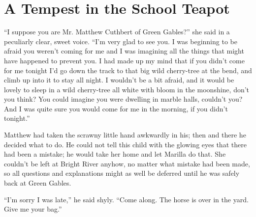 \documentclass{article}
\begin{document}
\section{A Tempest in the School Teapot}
``I suppose you are Mr. Matthew Cuthbert of Green Gables?'' she said in a peculiarly clear, sweet voice. ``I'm very glad to see you. I was beginning to be afraid you weren't coming for me and I was imagining all the things that might have happened to prevent you. I had made up my mind that if you didn't come for me tonight I'd go down the track to that big wild cherry-tree at the bend, and climb up into it to stay all night. I wouldn't be a bit afraid, and it would be lovely to sleep in a wild cherry-tree all white with bloom in the moonshine, don't you think? You could imagine you were dwelling in marble halls, couldn't you? And I was quite sure you would come for me in the morning, if you didn't tonight.''

Matthew had taken the scrawny little hand awkwardly in his; then and there he decided what to do. He could not tell this child with the glowing eyes that there had been a mistake; he would take her home and let Marilla do that. She couldn't be left at Bright River anyhow, no matter what mistake had been made, so all questions and explanations might as well be deferred until he was safely back at Green Gables.

``I'm sorry I was late,'' he said shyly. ``Come along. The horse is over in the yard. Give me your bag.''
\end{document}

